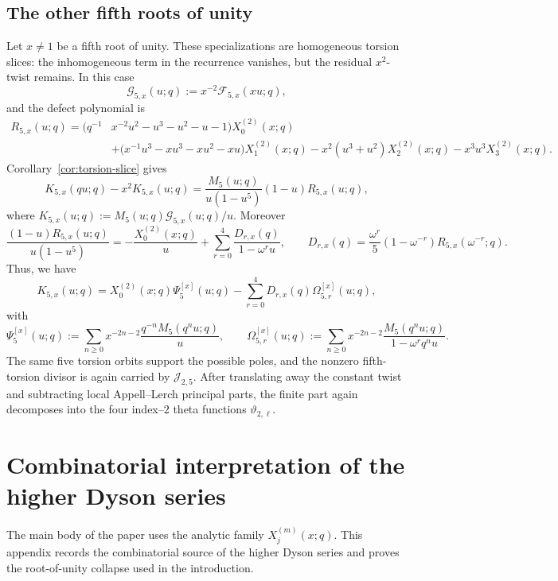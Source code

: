 \documentclass[12pt]{amsart}
\numberwithin{equation}{section}
\begin{document}
\subsection{The other fifth roots of unity}

Let \(x\neq1\) be a fifth root of unity.  These specializations are homogeneous torsion slices: the inhomogeneous term in the recurrence vanishes, but the residual \(x^2\)-twist remains.  In this case
\[
\mathcal G_{5,x}(u;q):=x^{-2}\mathcal F_{5,x}(xu;q),
\]
and the defect polynomial is
\begin{displaymath}
\begin{split}
R_{5,x}(u;q)
=\bigl(q^{-1}&x^{-2}u^2-u^3-u^2-u-1\bigr)X_0^{(2)}(x;q) \\
&+\bigl(x^{-1}u^3-xu^3-xu^2-xu\bigr)X_1^{(2)}(x;q) 
-x^2(u^3+u^2)X_2^{(2)}(x;q)-x^3u^3X_3^{(2)}(x;q).
\end{split}
\end{displaymath}
Corollary~\ref{cor:torsion-slice} gives
\[
K_{5,x}(qu;q)-x^2K_{5,x}(u;q)
=
\frac{M_5(u;q)}{u(1-u^5)}(1-u)R_{5,x}(u;q),
\]
where \(K_{5,x}(u;q):=M_5(u;q)\mathcal G_{5,x}(u;q)/u\).  Moreover
\[
\frac{(1-u)R_{5,x}(u;q)}{u(1-u^5)}
=
-\frac{X_0^{(2)}(x;q)}{u}
+
\sum_{r=0}^4\frac{D_{r,x}(q)}{1-\omega^ru},
\qquad
D_{r,x}(q)=\frac{\omega^r}{5}(1-\omega^{-r})R_{5,x}(\omega^{-r};q).
\]
Thus, we have
\[
K_{5,x}(u;q)=X_0^{(2)}(x;q)\Psi_5^{[x]}(u;q)-\sum_{r=0}^4D_{r,x}(q)\Omega_{5,r}^{[x]}(u;q),
\]
with
\[
\Psi_5^{[x]}(u;q):=\sum_{n\geq0}x^{-2n-2}\frac{q^{-n}M_5(q^nu;q)}{u},
\qquad
\Omega_{5,r}^{[x]}(u;q):=\sum_{n\geq0}x^{-2n-2}\frac{M_5(q^nu;q)}{1-\omega^rq^nu}.
\]
The same five torsion orbits support the possible poles, and the nonzero fifth-torsion divisor is again carried by \(\mathcal J_{2,5}\).  After translating away the constant twist and subtracting local Appell--Lerch principal parts, the finite part again decomposes into the four index--\(2\) theta functions \(\vartheta_{2,\ell}\).


\appendix

\section{Combinatorial interpretation of the higher Dyson series}\label{app:combinatorics}

The main body of the paper uses the analytic family \(X_j^{(m)}(x;q)\).
This appendix records the combinatorial source of the higher Dyson series
and proves the root-of-unity collapse used in the introduction.
\end{document}
